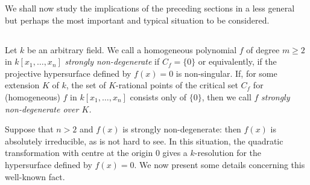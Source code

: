 We shall now study the implications of the preceding sections in a
less general but perhaps the most important and typical situation to
be considered.

\subsection{}\label{chap3:sec5:subsec1}%

Let $k$ be an arbitrary field. We call a homogeneous polynomial $f$ of
degree $m\geq 2$ in $k[x_{1},\ldots,x_{n}]$ {\em strongly
  non-degenerate} if $C_{f}=\{0\}$ or equivalently, if the projective
hypersurface defined by $f(x)=0$ is non-singular. If, for some
extension $K$ of $k$, the set of $K$-rational points of the critical
set $C_{f}$ for (homogeneous) $f$ in $k[x_{1},\ldots,x_{n}]$ consists
only of $\{0\}$, then we call $f$ {\em strongly non-degenerate over
  $K$.}

Suppose that $n>2$ and $f(x)$ is strongly non-degenerate: then $f(x)$
is absolutely irreducible, as is not hard to see. In this situation,
the quadratic transformation with centre at the origin $0$ gives a
$k$-resolution for the hypersurface defined by $f(x)=0$. We now
present some details concerning this well-known fact.

